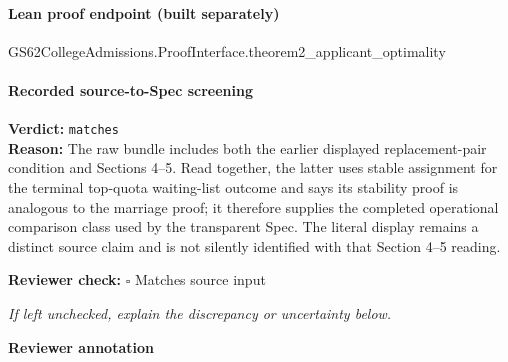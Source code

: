 \documentclass[10pt]{article}
\newcommand{\reviewerbox}{%
  \par\noindent\fbox{\parbox{0.96\linewidth}{\rule{0pt}{0.38in}}}\par
}
\newcommand{\reviewmatch}[1]{%
  \par\noindent\textbf{Reviewer check:} $\square$\; #1\par
  \noindent\emph{If left unchecked, explain the discrepancy or uncertainty below.}\par
}
\begin{document}
\paragraph{Lean proof endpoint (built separately)}\begin{ReviewVerbatim}
GS62CollegeAdmissions.ProofInterface.theorem2_applicant_optimality
\end{ReviewVerbatim}

\paragraph{Recorded source-to-Spec screening}
\textbf{Verdict:} \texttt{matches}
\\
\textbf{Reason:} The raw bundle includes both the earlier displayed replacement-pair condition and Sections 4--5. Read together, the latter uses stable assignment for the terminal top-quota waiting-list outcome and says its stability proof is analogous to the marriage proof; it therefore supplies the completed operational comparison class used by the transparent Spec. The literal display remains a distinct source claim and is not silently identified with that Section 4--5 reading.
\reviewmatch{Matches source input}
\noindent\textbf{Reviewer annotation}\par
\reviewerbox
\end{document}
